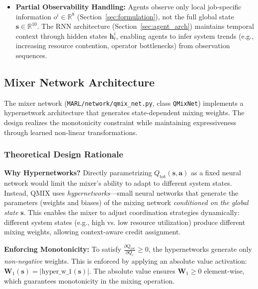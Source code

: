 \begin{itemize}
\item \textbf{Partial Observability Handling:} Agents observe only local job-specific information \(o^i \in \mathbb{R}^8\) (Section~\ref{sec:formulation}), not the full global state \(\mathbf{s} \in \mathbb{R}^{10}\). The RNN architecture (Section~\ref{sec:agent_arch}) maintains temporal context through hidden states \(\mathbf{h}_t^i\), enabling agents to infer system trends (e.g., increasing resource contention, operator bottlenecks) from observation sequences.
\end{itemize}

\subsection{Mixer Network Architecture}
\label{sec:mixer_arch}

The mixer network (\texttt{MARL/network/qmix\_net.py}, class \texttt{QMixNet}) implements a hypernetwork architecture that generates state-dependent mixing weights. The design realizes the monotonicity constraint while maintaining expressiveness through learned non-linear transformations.

\subsubsection{Theoretical Design Rationale}

\textbf{Why Hypernetworks?} Directly parametrizing \(Q_{\text{tot}}(\mathbf{s}, \mathbf{a})\) as a fixed neural network would limit the mixer's ability to adapt to different system states. Instead, QMIX uses \textit{hypernetworks}—small neural networks that generate the parameters (weights and biases) of the mixing network \textit{conditioned on the global state} \(\mathbf{s}\). This enables the mixer to adjust coordination strategies dynamically: different system states (e.g., high vs. low resource utilization) produce different mixing weights, allowing context-aware credit assignment.

\textbf{Enforcing Monotonicity:} To satisfy \(\frac{\partial Q_{\text{tot}}}{\partial Q_i} \geq 0\), the hypernetworks generate only \textit{non-negative} weights. This is enforced by applying an absolute value activation: \(\mathbf{W}_1(\mathbf{s}) = |\text{hyper\_w\_1}(\mathbf{s})|\). The absolute value ensures \(\mathbf{W}_1 \geq 0\) element-wise, which guarantees monotonicity in the mixing operation.

